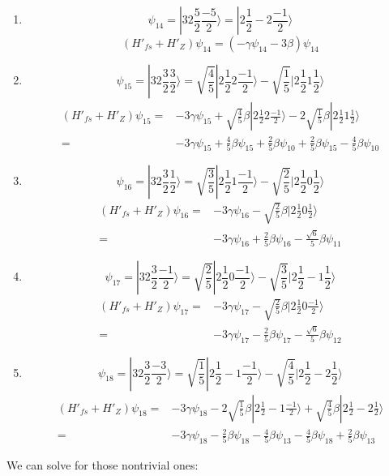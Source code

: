 \begin{enumerate}
    \item 
    $$
    \psi_{14} = |32\frac{5}{2}\frac{-5}{2}\rangle
    =
    |2\frac{1}{2}-2\frac{-1}{2}\rangle
    $$
    $$
    (H'_{fs} + H'_Z)\psi_{14} = 
    (-\gamma\psi_{14}-3\beta)\psi_{14}
    $$
    \item 
    $$
    \psi_{15} = |32\frac{3}{2}\frac{3}{2}\rangle
    =
    \sqrt{\frac{4}{5}}|2\frac{1}{2}2\frac{-1}{2}\rangle
    -\sqrt{\frac{1}{5}}
    |2\frac{1}{2}1\frac{1}{2}\rangle
    $$
    \begin{align*}
    (H'_{fs} + H'_Z)\psi_{15} = &
    -3\gamma\psi_{15}+
    \sqrt{\frac{4}{5}}\beta|2\frac{1}{2}2\frac{-1}{2}\rangle
    -2\sqrt{\frac{1}{5}}\beta
    |2\frac{1}{2}1\frac{1}{2}\rangle\\
    = & -3\gamma\psi_{15}+\frac{4}{5}\beta\psi_{15}
    +\frac{2}{5}\beta\psi_{10}
    +\frac{2}{5}\beta\psi_{15}
    -\frac{4}{5}\beta\psi_{10}
    \end{align*}
    
    \item 
    $$
    \psi_{16} = |32\frac{3}{2}\frac{1}{2}\rangle
    =
    \sqrt{\frac{3}{5}}|2\frac{1}{2}1\frac{-1}{2}\rangle
    -\sqrt{\frac{2}{5}}
    |2\frac{1}{2}0\frac{1}{2}\rangle
    $$
    \begin{align*}
    (H'_{fs} + H'_Z)\psi_{16} = &
    -3\gamma\psi_{16}
    -\sqrt{\frac{2}{5}}\beta
    |2\frac{1}{2}0\frac{1}{2}\rangle\\
    = & -3\gamma\psi_{16}+\frac{2}{5}\beta\psi_{16}
    -\frac{\sqrt{6}}{5}\beta\psi_{11}
    \end{align*}
    
    \item 
    $$
    \psi_{17} = |32\frac{3}{2}\frac{-1}{2}\rangle
    =
    \sqrt{\frac{2}{5}}|2\frac{1}{2}0\frac{-1}{2}\rangle
    -\sqrt{\frac{3}{5}}
    |2\frac{1}{2}-1\frac{1}{2}\rangle
    $$
    \begin{align*}
    (H'_{fs} + H'_Z)\psi_{17} = &
    -3\gamma\psi_{17}-
    \sqrt{\frac{2}{5}}\beta|2\frac{1}{2}0\frac{-1}{2}\rangle    \\
    = & -3\gamma\psi_{17}-\frac{2}{5}\beta\psi_{17}
    -\frac{\sqrt{6}}{5}\beta\psi_{12}
    \end{align*}
    
    \item 
    $$
    \psi_{18} = |32\frac{3}{2}\frac{-3}{2}\rangle
    =\sqrt{\frac{1}{5}}|2\frac{1}{2}-1\frac{-1}{2}\rangle
    -\sqrt{\frac{4}{5}}
    |2\frac{1}{2}-2\frac{1}{2}\rangle
    $$
    \begin{align*}
    (H'_{fs} + H'_Z)\psi_{18} = &
    -3\gamma\psi_{18}-2
    \sqrt{\frac{1}{5}}\beta|2\frac{1}{2}-1\frac{-1}{2}\rangle
    +\sqrt{\frac{4}{5}}\beta
    |2\frac{1}{2}-2\frac{1}{2}\rangle\\
    = & -3\gamma\psi_{18}-\frac{2}{5}\beta\psi_{18}
    -\frac{4}{5}\beta\psi_{13}
    -\frac{4}{5}\beta\psi_{18}
    +\frac{2}{5}\beta\psi_{13}
    \end{align*}
    
\end{enumerate}
We can solve for those nontrivial ones: 

